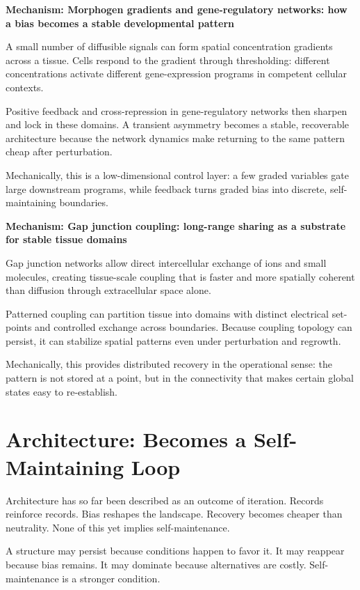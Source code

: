 \documentclass[11pt,twoside,openright]{book}
\newenvironment{mechanismbox}[1]
  {\begin{framed}\noindent\textbf{Mechanism: #1}\par\medskip}
  {\end{framed}}
\begin{document}
\begin{mechanismbox}{Morphogen gradients and gene-regulatory networks: how a bias becomes a stable developmental pattern}
A small number of diffusible signals can form spatial concentration gradients across a tissue.
Cells respond to the gradient through thresholding:
different concentrations activate different gene-expression programs
in competent cellular contexts.

Positive feedback and cross-repression in gene-regulatory networks then sharpen and lock in these domains. A transient asymmetry becomes a stable, recoverable architecture because the network dynamics make returning to the same pattern cheap after perturbation.

Mechanically, this is a low-dimensional control layer: a few graded variables gate large downstream programs, while feedback turns graded bias into discrete, self-maintaining boundaries.
\end{mechanismbox}
\begin{mechanismbox}{Gap junction coupling: long-range sharing as a substrate for stable tissue domains}
Gap junction networks allow direct intercellular exchange of ions and small molecules, creating tissue-scale coupling that is faster and more spatially coherent than diffusion through extracellular space alone.

Patterned coupling can partition tissue into domains with distinct electrical set-points and controlled exchange across boundaries. Because coupling topology can persist, it can stabilize spatial patterns even under perturbation and regrowth.

Mechanically, this provides distributed recovery in the operational sense:
the pattern is not stored at a point,
but in the connectivity that makes certain global states easy to re-establish.
\end{mechanismbox}

\chapter{Architecture: Becomes a Self-Maintaining Loop}

Architecture has so far been described as an outcome of iteration. Records reinforce records. Bias reshapes the landscape. Recovery becomes cheaper than neutrality. None of this yet implies self-maintenance.

A structure may persist because conditions happen to favor it. It may reappear because bias remains. It may dominate because alternatives are costly. Self-maintenance is a stronger condition.
\end{document}
